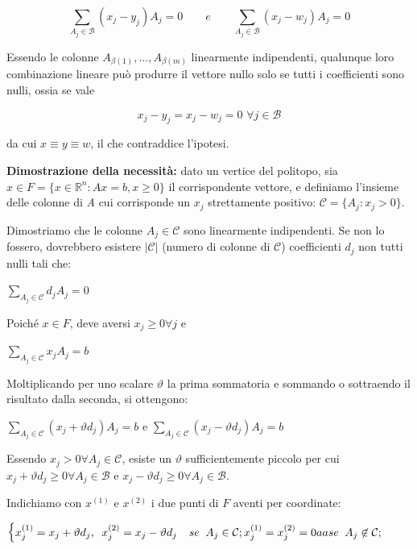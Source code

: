 \documentclass[11pt]{book}
\makeatletter
\newenvironment{sistema}%
{\left\lbrace\begin{array}{@{}l@{}}}%
{\end{array}\right.}
\makeatother
\begin{document}
$$\sum_{A_j \in \mathcal B}(x_j-y_j)A_j=0 \qquad e \qquad \sum_{A_j \in \mathcal B}(x_j-w_j)A_j=0$$

Essendo le colonne $A_{\beta(1)},...,A_{\beta(m)}$ linearmente
indipendenti, qualunque loro combinazione lineare pu\`o produrre il
vettore nullo solo se tutti i coefficienti sono nulli, ossia se vale

$$x_j-y_j=x_j-w_j=0 \phantom{i} \forall j \in \mathcal B$$

da cui $x\equiv y \equiv w$, il che contraddice l'ipotesi.
\newline

{\bf Dimostrazione della necessit\`a:} dato un vertice del politopo,
sia $x \in F = \{ x \in \mathbb{R}^n : Ax = b, x \geq 0 \}$ il
corrispondente vettore, e definiamo l'insieme delle colonne di {\em A}
cui corrisponde un $x_j$ strettamente positivo: $\mathcal{C} = \{ A_j
: x_j > 0 \}$.

Dimostriamo che le colonne $A_j \in \mathcal{C}$ sono linearmente
indipendenti. Se non lo fossero, dovrebbero esistere $|\mathcal{C}|$
(numero di colonne di $\mathcal{C}$) coefficienti $d_j$ non tutti
nulli tali che:

\begin{center}
$\sum\limits_{A_j \in \mathcal{C}} d_j A_j = 0 $
\end{center}

Poich\'e $x \in F$, deve aversi $x_j \geq 0 \forall j$ e

\begin{center}
$\sum\limits_{A_j \in \mathcal{C}} x_j A_j = b$
\end{center}

Moltiplicando per uno scalare $\vartheta$ la prima sommatoria e
sommando o sottraendo il risultato dalla seconda, si ottengono:

\begin{center}
$\sum\limits_{A_j \in \mathcal{C}} (x_j + \vartheta d_j)A_j = b $  e $\sum\limits_{A_j \in \mathcal{C}} (x_j - \vartheta d_j)A_j = b $
\end{center}

Essendo $x_j > 0 \forall A_j \in \mathcal{C}$, esiste un $\vartheta$
sufficientemente piccolo per cui $x_j + \vartheta d_j \geq 0 \forall
A_j \in \mathcal{B}$ e $x_j - \vartheta d_j \geq 0 \forall A_j \in
\mathcal{B}$.

Indichiamo con $x^{(1)}$ e $x^{(2)}$ i due punti di $F$ aventi per
coordinate:

\begin{center}
$\begin{sistema}
x^{(1)}_j = x_j + \vartheta d_j,\phantom{a}x_j^{(2)} = x_j - \vartheta
d_j\phantom{aa}se\phantom{a}A_j \in \mathcal{C};

x^{(1)}_j = x_j^{(2)} = 0{aa}se\phantom{a}A_j \not \in \mathcal{C};
\end{sistema}$
\end{center}
\end{document}
